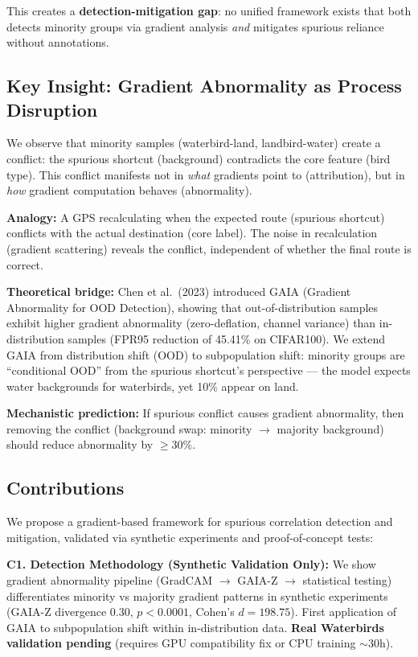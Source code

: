 This creates a \textbf{detection-mitigation gap}: no unified framework exists that both detects minority groups via gradient analysis \emph{and} mitigates spurious reliance without annotations.

\subsection{Key Insight: Gradient Abnormality as Process Disruption}

We observe that minority samples (waterbird-land, landbird-water) create a conflict: the spurious shortcut (background) contradicts the core feature (bird type). This conflict manifests not in \emph{what} gradients point to (attribution), but in \emph{how} gradient computation behaves (abnormality).

\textbf{Analogy:} A GPS recalculating when the expected route (spurious shortcut) conflicts with the actual destination (core label). The noise in recalculation (gradient scattering) reveals the conflict, independent of whether the final route is correct.

\textbf{Theoretical bridge:} Chen et al.~(2023) introduced GAIA (Gradient Abnormality for OOD Detection), showing that out-of-distribution samples exhibit higher gradient abnormality (zero-deflation, channel variance) than in-distribution samples (FPR95 reduction of 45.41\% on CIFAR100). We extend GAIA from distribution shift (OOD) to subpopulation shift: minority groups are ``conditional OOD'' from the spurious shortcut's perspective --- the model expects water backgrounds for waterbirds, yet 10\% appear on land.

\textbf{Mechanistic prediction:} If spurious conflict causes gradient abnormality, then removing the conflict (background swap: minority $\rightarrow$ majority background) should reduce abnormality by $\geq$30\%.

\subsection{Contributions}

We propose a gradient-based framework for spurious correlation detection and mitigation, validated via synthetic experiments and proof-of-concept tests:

\textbf{C1. Detection Methodology (Synthetic Validation Only):} We show gradient abnormality pipeline (GradCAM $\rightarrow$ GAIA-Z $\rightarrow$ statistical testing) differentiates minority vs majority gradient patterns in synthetic experiments (GAIA-Z divergence 0.30, $p<0.0001$, Cohen's $d=198.75$). First application of GAIA to subpopulation shift within in-distribution data. \textbf{Real Waterbirds validation pending} (requires GPU compatibility fix or CPU training $\sim$30h).

